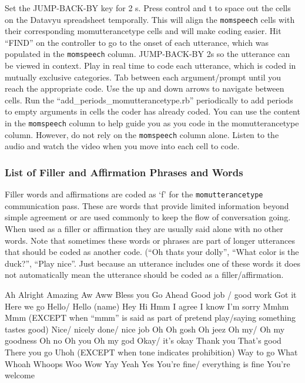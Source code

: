 \documentclass[
]{book}
\begin{document}
Set the JUMP-BACK-BY key for 2 s.
Press control and t to space out the cells on the Datavyu spreadsheet temporally. This will align the \texttt{momspeech} cells with their corresponding momutterancetype cells and will make coding easier.
Hit ``FIND'' on the controller to go to the onset of each utterance, which was populated in the \texttt{momspeech} column.
JUMP-BACK-BY 2s so the utterance can be viewed in context.
Play in real time to code each utterance, which is coded in mutually exclusive categories. Tab between each argument/prompt until you reach the appropriate code. Use the up and down arrows to navigate between cells.
Run the ``add\_periods\_momutterancetype.rb'' periodically to add periods to empty arguments in cells the coder has already coded.
You can use the content in the \texttt{momspeech} column to help guide you as you code in the momutterancetype column. However, do not rely on the \texttt{momspeech} column alone. Listen to the audio and watch the video when you move into each cell to code.

\hypertarget{filler_words}{%
\subsubsection*{List of Filler and Affirmation Phrases and Words}\label{filler_words}}

Filler words and affirmations are coded as `f' for the \texttt{momutterancetype} communication pass. These are words that provide limited information beyond simple agreement or are used commonly to keep the flow of conversation going. When used as a filler or affirmation they are usually said alone with no other words. Note that sometimes these words or phrases are part of longer utterances that should be coded as another code. (``Oh thats your dolly'', ``What color is the duck?'', ``Play nice''. Just because an utterance includes one of these words it does not automatically mean the utterance should be coded as a filler/affirmation.

Ah
Alright
Amazing
Aw
Aww
Bless you
Go Ahead
Good job / good work
Got it
Here we go
Hello/ Hello (name)
Hey
Hi
Hmm
I agree
I know
I'm sorry
Mmhm
Mmm (EXCEPT when ``mmm'' is said as part of pretend play/saying something tastes good)
Nice/ nicely done/ nice job
Oh
Oh gosh
Oh jeez
Oh my/ Oh my goodness
Oh no
Oh you
Oh my god
Okay/ it's okay
Thank you
That's good
There you go
Uhoh (EXCEPT when tone indicates prohibition)
Way to go
What
Whoah
Whoops
Woo
Wow
Yay
Yeah
Yes
You're fine/ everything is fine
You're welcome
\end{document}
